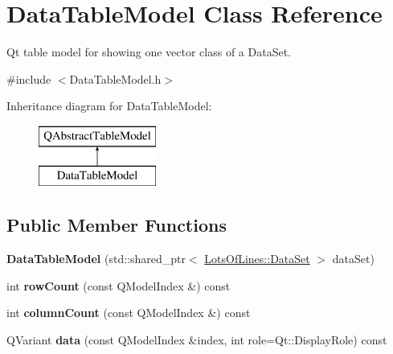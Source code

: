\hypertarget{class_data_table_model}{}\section{Data\+Table\+Model Class Reference}
\label{class_data_table_model}


Qt table model for showing one vector class of a Data\+Set.  




{\ttfamily \#include $<$Data\+Table\+Model.\+h$>$}

Inheritance diagram for Data\+Table\+Model\+:\begin{figure}[H]
\begin{center}
\leavevmode
\includegraphics[height=2.000000cm]{class_data_table_model}
\end{center}
\end{figure}
\subsection*{Public Member Functions}
\begin{DoxyCompactItemize}
\item 
{\bfseries Data\+Table\+Model} (std\+::shared\+\_\+ptr$<$ \hyperlink{class_lots_of_lines_1_1_data_set}{Lots\+Of\+Lines\+::\+Data\+Set} $>$ data\+Set)\hypertarget{class_data_table_model_a9887aeddc9dccb859088f489d7256382}{}\label{class_data_table_model_a9887aeddc9dccb859088f489d7256382}

\item 
int {\bfseries row\+Count} (const Q\+Model\+Index \&) const \hypertarget{class_data_table_model_a6d4d1992ec2a0e0a7383c24a303441d9}{}\label{class_data_table_model_a6d4d1992ec2a0e0a7383c24a303441d9}

\item 
int {\bfseries column\+Count} (const Q\+Model\+Index \&) const \hypertarget{class_data_table_model_a1fcc264e8a9f32ed21514f0bfe048ef4}{}\label{class_data_table_model_a1fcc264e8a9f32ed21514f0bfe048ef4}

\item 
Q\+Variant {\bfseries data} (const Q\+Model\+Index \&index, int role=Qt\+::\+Display\+Role) const \hypertarget{class_data_table_model_afb7afd448abaca507716b9042f97709a}{}\label{class_data_table_model_afb7afd448abaca507716b9042f97709a}

\end{DoxyCompactItemize}


